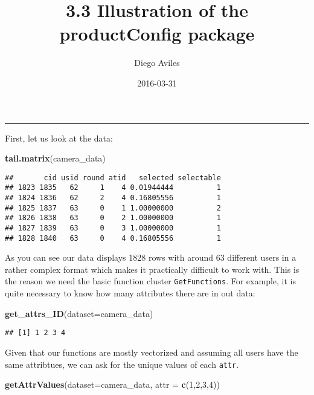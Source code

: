 \documentclass[]{article}
\title{3.3 Illustration of the productConfig package}
\author{Diego Aviles}
\date{2016-03-31}
\newenvironment{Shaded}{\begin{snugshade}}{\end{snugshade}}
\newcommand{\KeywordTok}[1]{\textcolor[rgb]{0.13,0.29,0.53}{\textbf{{#1}}}}
\newcommand{\DataTypeTok}[1]{\textcolor[rgb]{0.13,0.29,0.53}{{#1}}}
\newcommand{\DecValTok}[1]{\textcolor[rgb]{0.00,0.00,0.81}{{#1}}}
\newcommand{\NormalTok}[1]{{#1}}
\begin{document}
\maketitle


\begin{center}\rule{0.5\linewidth}{\linethickness}\end{center}

First, let us look at the data:

\begin{Shaded}
\begin{Highlighting}[]
\KeywordTok{tail.matrix}\NormalTok{(camera_data)}
\end{Highlighting}
\end{Shaded}

\begin{verbatim}
##       cid usid round atid   selected selectable
## 1823 1835   62     1    4 0.01944444          1
## 1824 1836   62     2    4 0.16805556          1
## 1825 1837   63     0    1 1.00000000          2
## 1826 1838   63     0    2 1.00000000          1
## 1827 1839   63     0    3 1.00000000          1
## 1828 1840   63     0    4 0.16805556          1
\end{verbatim}

As you can see our data displays 1828 rows with around 63 different
users in a rather complex format which makes it practically difficult to
work with. This is the reason we need the basic function cluster
\texttt{GetFunctions}. For example, it is quite necessary to know how
many attributes there are in out data:

\begin{Shaded}
\begin{Highlighting}[]
\KeywordTok{get_attrs_ID}\NormalTok{(}\DataTypeTok{dataset=}\NormalTok{camera_data)}
\end{Highlighting}
\end{Shaded}

\begin{verbatim}
## [1] 1 2 3 4
\end{verbatim}

Given that our functions are mostly vectorized and assuming all users
have the same attribtues, we can ask for the unique values of each
\texttt{attr}.

\begin{Shaded}
\begin{Highlighting}[]
\KeywordTok{getAttrValues}\NormalTok{(}\DataTypeTok{dataset=}\NormalTok{camera_data, }\DataTypeTok{attr =} \KeywordTok{c}\NormalTok{(}\DecValTok{1}\NormalTok{,}\DecValTok{2}\NormalTok{,}\DecValTok{3}\NormalTok{,}\DecValTok{4}\NormalTok{))}
\end{Highlighting}
\end{Shaded}
\end{document}
